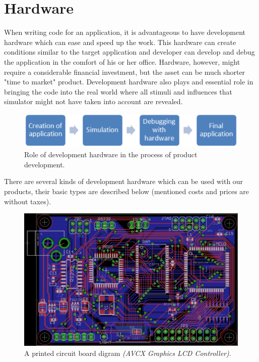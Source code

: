 \documentclass[a4paper,twoside,15pt]{book}
\begin{document}
    \clearpage
    \section{Hardware}
        When writing code for an application, it is advantageous to have development hardware which can ease and speed up the work. This hardware can create conditions similar to the target application and developer can develop and debug the application in the comfort of his or her office. Hardware, however, might require a considerable financial investment, but the asset can be much shorter "time to market" product. Development hardware also plays and essential role in bringing the code into the real world where all stimuli and influences that simulator might not have taken into account are revealed.
        \begin{figure}[h!]
            \centering{}
            \includegraphics[width=.9\textwidth]{images/prvni_obr_pod_hardware.png}
            \caption{Role of development hardware in the process of product development.}
        \end{figure}

        There are several kinds of development hardware which can be used with our products, their basic types are described below (mentioned costs and prices are without taxes).
        \begin{figure}[h!]
            \centering{}
            \includegraphics[width=.7\textwidth]{images/pcb.png}
            \caption{A printed circuit board digram \textit{(AVCX Graphics LCD Controller)}.}
        \end{figure}
\end{document}
